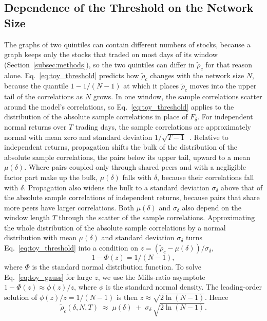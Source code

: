 \documentclass[a4paper,fleqn]{cas-sc}
\begin{document}
\subsection{Dependence of the Threshold on the Network Size}\label{subsec:network_size}

The graphs of two quintiles can contain different numbers of stocks, because a graph keeps only the stocks that traded on most days of its window (Section~\ref{subsec:methods}), so the two quintiles can differ in $\tilde\rho_c$ for that reason alone. Eq.~\eqref{eq:toy_threshold} predicts how $\tilde\rho_c$ changes with the network size $N$, because the quantile $1 - 1/(N-1)$ at which it places $\tilde\rho_c$ moves into the upper tail of the correlations as $N$ grows. In one window, the sample correlations scatter around the model's correlations, so Eq.~\eqref{eq:toy_threshold} applies to the distribution of the absolute sample correlations in place of $F_\delta$. For independent normal returns over $T$ trading days, the sample correlations are approximately normal with mean zero and standard deviation $1/\sqrt{T-1}$~\citep{fisher1915frequency}. Relative to independent returns, propagation shifts the bulk of the distribution of the absolute sample correlations, the pairs below its upper tail, upward to a mean $\mu(\delta)$. Where pairs coupled only through shared peers and with a negligible factor part make up the bulk, $\mu(\delta)$ falls with $\delta$, because their correlations fall with $\delta$. Propagation also widens the bulk to a standard deviation $\sigma_\delta$ above that of the absolute sample correlations of independent returns, because pairs that share more peers have larger correlations. Both $\mu(\delta)$ and $\sigma_\delta$ also depend on the window length $T$ through the scatter of the sample correlations. Approximating the whole distribution of the absolute sample correlations by a normal distribution with mean $\mu(\delta)$ and standard deviation $\sigma_\delta$ turns Eq.~\eqref{eq:toy_threshold} into a condition on $z = (\tilde\rho_c - \mu(\delta))/\sigma_\delta$,
\begin{equation}\label{eq:toy_gauss}
  1 - \Phi(z) = 1/(N-1),
\end{equation}
where $\Phi$ is the standard normal distribution function. To solve Eq.~\eqref{eq:toy_gauss} for large $z$, we use the Mills-ratio asymptote $1 - \Phi(z) \approx \phi(z)/z$, where $\phi$ is the standard normal density. The leading-order solution of $\phi(z)/z = 1/(N-1)$ is then $z \approx \sqrt{2\ln(N-1)}$. Hence
\begin{equation}\label{eq:toy_closed_form}
  \tilde\rho_c(\delta, N, T) \;\approx\; \mu(\delta) \;+\; \sigma_\delta\,\sqrt{2 \ln(N - 1)}.
\end{equation}
\end{document}
